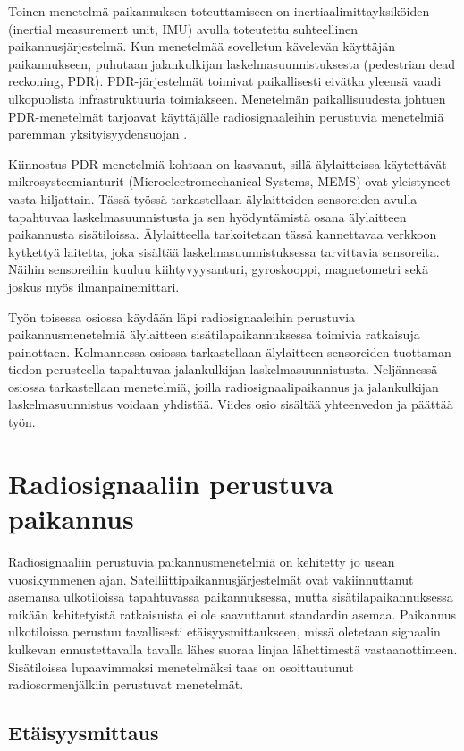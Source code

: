 Toinen menetelmä paikannuksen toteuttamiseen on inertiaalimittayksiköiden
(inertial measurement unit, IMU) avulla toteutettu suhteellinen
paikannusjärjestelmä. Kun menetelmää sovelletun kävelevän käyttäjän
paikannukseen, puhutaan jalankulkijan laskelmasuunnistuksesta 
(pedestrian dead reckoning, PDR). PDR-järjestelmät toimivat
paikallisesti eivätka yleensä vaadi ulkopuolista infrastruktuuria toimiakseen.
Menetelmän paikallisuudesta johtuen PDR-menetelmät tarjoavat käyttäjälle
radiosignaaleihin perustuvia menetelmiä paremman yksityisyydensuojan
\cite{harle2013}.

Kiinnostus PDR-menetelmiä kohtaan on kasvanut, sillä älylaitteissa käytettävät
mikrosysteemianturit (Microelectromechanical
Systems, MEMS) ovat yleistyneet vasta hiljattain. Tässä työssä tarkastellaan
älylaitteiden sensoreiden avulla tapahtuvaa laskelmasuunnistusta ja sen
hyödyntämistä osana älylaitteen paikannusta sisätiloissa.
Älylaitteella tarkoitetaan tässä kannettavaa verkkoon kytkettyä laitetta, joka
sisältää laskelmasuunnistuksessa tarvittavia sensoreita. Näihin sensoreihin
kuuluu kiihtyvyysanturi, gyroskooppi, magnetometri sekä joskus myös
ilmanpainemittari.

Työn toisessa osiossa käydään läpi radiosignaaleihin
perustuvia paikannusmenetelmiä älylaitteen sisätilapaikannuksessa toimivia
ratkaisuja painottaen. Kolmannessa osiossa tarkastellaan älylaitteen
sensoreiden tuottaman tiedon perusteella tapahtuvaa jalankulkijan
laskelmasuunnistusta. Neljännessä osiossa tarkastellaan menetelmiä, joilla
radiosignaalipaikannus ja jalankulkijan laskelmasuunnistus voidaan yhdistää.
Viides osio sisältää yhteenvedon ja päättää työn.

\section{Radiosignaaliin perustuva paikannus}

Radiosignaaliin perustuvia paikannusmenetelmiä on kehitetty jo usean 
vuosikymmenen
ajan. Satelliittipaikannusjärjestelmät ovat vakiinnuttanut asemansa ulkotiloissa
tapahtuvassa paikannuksessa, mutta sisätilapaikannuksessa mikään kehitetyistä
ratkaisuista ei ole saavuttanut standardin asemaa. Paikannus ulkotiloissa
perustuu tavallisesti etäisyysmittaukseen, missä oletetaan signaalin kulkevan
ennustettavalla tavalla lähes suoraa linjaa lähettimestä vastaanottimeen.
Sisätiloissa lupaavimmaksi menetelmäksi taas on osoittautunut
radiosormenjälkiin perustuvat menetelmät.

\subsection{Etäisyysmittaus}

